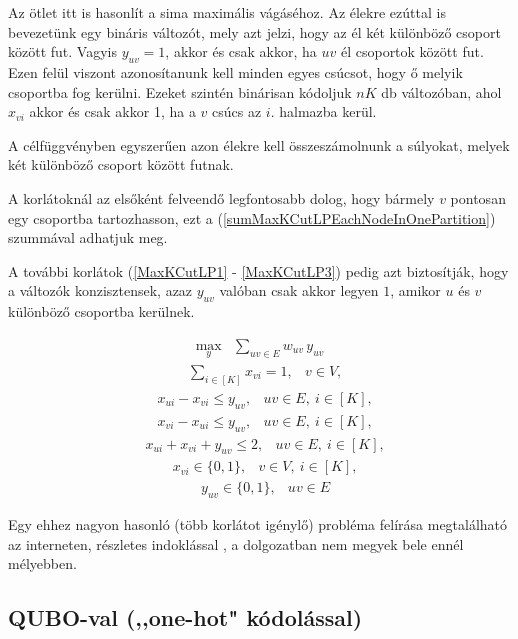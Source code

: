 Az ötlet itt is hasonlít a sima maximális vágáséhoz. Az élekre ezúttal is bevezetünk egy bináris változót, mely azt jelzi, hogy az él két különböző csoport között fut. Vagyis $y_{uv}=1$, akkor és csak akkor, ha $uv$ él csoportok között fut. Ezen felül viszont azonosítanunk kell minden egyes csúcsot, hogy ő melyik csoportba fog kerülni. Ezeket szintén binárisan kódoljuk $nK$ db változóban, ahol $x_{vi}$ akkor és csak akkor 1, ha a $v$ csúcs az $i.$ halmazba kerül. 

A célfüggvényben egyszerűen azon élekre kell összeszámolnunk a súlyokat, melyek két különböző csoport között futnak.

A korlátoknál az elsőként felveendő legfontosabb dolog, hogy bármely $v$ pontosan egy csoportba tartozhasson, ezt a (\ref{sumMaxKCutLPEachNodeInOnePartition}) szummával adhatjuk meg.

A további korlátok (\ref{MaxKCutLP1} - \ref{MaxKCutLP3}) pedig azt biztosítják, hogy a változók konzisztensek, azaz $y_{uv}$ valóban csak akkor legyen $1$, amikor $u$ és $v$ különböző csoportba kerülnek.

\begin{align} \max _{y} &\sum _{{uv} \in E} w_{uv} \, y_{uv}  \end{align}
\begin{align} &\sum _{i \in [K]} x_{vi} = 1,&v \in V, \label{sumMaxKCutLPEachNodeInOnePartition} \end{align}
\begin{align}&x_{ui} - x_{vi} \le y_{uv},& uv \in E, \ i\in [K], \label{MaxKCutLP1} \end{align}
\begin{align}&x_{vi} - x_{ui} \le y_{uv},& uv \in E, \ i\in [K], \end{align}
\begin{align}&x_{ui} + x_{vi} + y_{uv} \le 2,& uv \in E, \ i\in [K], \label{MaxKCutLP3} \end{align}
\begin{align}&x_{vi} \in \{{0,1}\} ,&v \in V, \ i\in [K],\end{align}
\begin{align}&y_{uv} \in \{{0,1}\} ,& uv \in E \label{MaxKCutLP5} \end{align}

Egy ehhez nagyon hasonló (több korlátot igénylő) probléma felírása megtalálható az interneten, részletes indoklással \cite{Hojny2021}, a dolgozatban nem megyek bele ennél mélyebben. 

\subsection{QUBO-val (,,one-hot" kódolással)}\label{sec:QUBOonehot}


